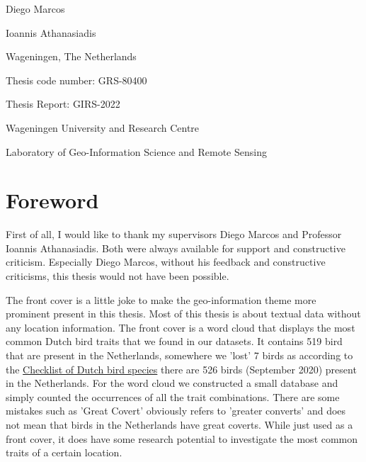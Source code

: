\documentclass[a4paper, 12pt, oneside]{book} %
\begin{document}
\begin{titlingpage}
\begin{center}
  {Diego Marcos}
  
  {Ioannis Athanasiadis}\vspace{3.0cm}
  
  
  
  \end{center}
  
  \begin{center}
    {\thedate}
  
    {Wageningen, The Netherlands}
  \end{center}\vspace{5cm}

    Thesis code number: GRS-80400
  
    Thesis Report: GIRS-2022
  
    {Wageningen University and Research Centre}
  
    {Laboratory of Geo-Information Science and Remote Sensing}
 \end{titlingpage}
 \restoregeometry
\graphicspath{ {./figures/} }

\newpage
\thispagestyle{empty}
\section*{Foreword}
First of all, I would like to thank my supervisors Diego Marcos and Professor Ioannis Athanasiadis.
Both were always available for support and constructive criticism.
Especially Diego Marcos, without his feedback and constructive criticisms, this thesis would not have been possible.
\newline

\noindent
The front cover is a little joke to make the geo-information theme more prominent present in this thesis. 
Most of this thesis is about textual data without any location information.
The front cover is a word cloud that displays the most common Dutch bird traits that we found in our datasets. 
It contains 519 bird that are present in the Netherlands, somewhere we 'lost' 7 birds as according to the \href{https://avibase.bsc-eoc.org/checklist.jsp?region=NL&list=howardmoore}{Checklist of Dutch bird species} there are 526 birds (September 2020) present in the Netherlands.
For the word cloud we constructed a small database and simply counted the occurrences of all the trait combinations.
There are some mistakes such as 'Great Covert' obviously refers to 'greater converts' and does not mean that birds in the Netherlands have great coverts.  
While just used as a front cover, it does have some research potential to investigate the most common traits of a certain location.
\end{document}
